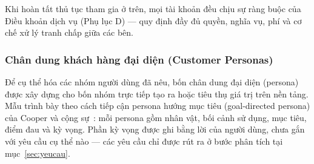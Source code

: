 Khi hoàn tất thủ tục tham gia ở trên, mọi tài khoản đều chịu sự ràng buộc của Điều khoản dịch vụ (Phụ lục D) --- quy định đầy đủ quyền, nghĩa vụ, phí và cơ chế xử lý tranh chấp giữa các bên.

\subsubsection{Chân dung khách hàng đại diện (Customer Personas)}
\label{subsec:customer-personas}

Để cụ thể hóa các nhóm người dùng đã nêu, bốn chân dung đại diện (persona) được xây dựng cho bốn nhóm trực tiếp tạo ra hoặc tiêu thụ giá trị trên nền tảng. Mẫu trình bày theo cách tiếp cận persona hướng mục tiêu (goal-directed persona) của Cooper và cộng sự~\cite{cooper2014aboutface}: mỗi persona gồm nhân vật, bối cảnh sử dụng, mục tiêu, điểm đau và kỳ vọng. Phần kỳ vọng được ghi bằng lời của người dùng, chưa gắn với yêu cầu cụ thể nào --- các yêu cầu chỉ được rút ra ở bước phân tích tại mục~\ref{sec:yeucau}.

